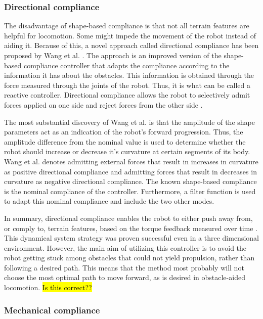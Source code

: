 \subsubsection{Directional compliance}

The disadvantage of shape-based compliance is that not all terrain features are helpful for locomotion. Some might impede the movement of the robot instead of aiding it. Because of this, a novel approach called directional compliance has been proposed by Wang et al. \cite{wang2020directional}. The approach is an improved version of the shape-based compliance controller that adapts the compliance according to the information it has about the obstacles. This information is obtained through the force measured through the joints of the robot. Thus, it is what can be called a reactive controller. Directional compliance allows the robot to selectively admit forces applied on one side and reject forces from the other side \cite{wang2020directional}.

The most substantial discovery of Wang et al. \cite{wang2020directional} is that the amplitude of the shape parameters act as an indication of the robot's forward progression. Thus, the amplitude difference from the nominal value is used to determine whether the robot should increase or decrease it's curvature at certain segments of its body. Wang et al. \cite{wang2020directional} denotes admitting external forces that result in increases in curvature as positive directional compliance and admitting forces that result in decreases in curvature as negative directional compliance. The known shape-based compliance is the nominal compliance of the controller. Furthermore, a filter function is used to adapt this nominal compliance and include the two other modes.

In summary, directional compliance enables the robot to either push away from, or comply to, terrain features, based on the torque feedback measured over time \cite{wang2020directional}. This dynamical system strategy was proven successful even in a three dimensional environment. However, the main aim of utilizing this controller is to avoid the robot getting stuck among obstacles that could not yield propulsion, rather than following a desired path. This means that the method most probably will not choose the most optimal path to move forward, as is desired in obstacle-aided locomotion.
\hl{Is this correct??}

\subsubsection{Mechanical compliance}

